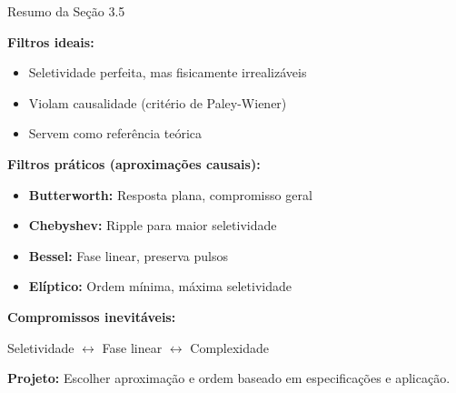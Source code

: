 \begin{frame}{Resumo da Seção 3.5}

\textbf{Filtros ideais:}

\begin{itemize}
\item Seletividade perfeita, mas fisicamente irrealizáveis
\item Violam causalidade (critério de Paley-Wiener)
\item Servem como referência teórica
\end{itemize}

\vspace{0.1cm}

\textbf{Filtros práticos (aproximações causais):}

\begin{itemize}
\item \textbf{Butterworth:} Resposta plana, compromisso geral
\item \textbf{Chebyshev:} Ripple para maior seletividade
\item \textbf{Bessel:} Fase linear, preserva pulsos
\item \textbf{Elíptico:} Ordem mínima, máxima seletividade
\end{itemize}

\vspace{0.1cm}

\textbf{Compromissos inevitáveis:}

Seletividade $\leftrightarrow$ Fase linear $\leftrightarrow$ Complexidade

\textbf{Projeto:} Escolher aproximação e ordem baseado em especificações e aplicação.

\end{frame}
